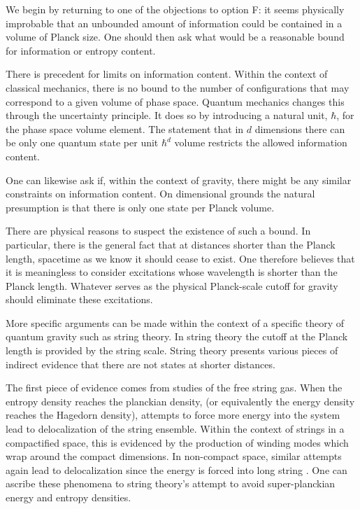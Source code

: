 \itemskip
We begin by returning to one of the objections to option F:
it seems physically improbable that
an unbounded amount of information could be
contained in a volume of Planck size.  One should then ask what would be
a reasonable bound for information or entropy content.

There is precedent for limits on information content.
Within the context of classical mechanics, there is no bound to the
number of configurations that may correspond to a given volume of phase
space.  Quantum mechanics changes this through the uncertainty
principle.  It does so
by introducing
a  natural unit,
$\hbar$,
for the phase space volume element.
The statement that in $d$ dimensions there  can be only
one quantum state per unit $\hbar^d$ volume  restricts the
allowed information content.

One can likewise ask if, within the context of gravity, there might
be any similar constraints on information content.
On dimensional grounds the natural presumption is that there is
only one state per Planck volume.

There are physical reasons to suspect the existence
of such a bound.  In particular, there
is the general fact that at distances shorter
than the Planck length, spacetime as we know it should cease to exist.
One therefore believes that it is meaningless to consider excitations
whose wavelength is shorter than the Planck length.  Whatever serves
as the physical Planck-scale cutoff for gravity should eliminate
these excitations.

More specific arguments can be made within the context of a specific
theory of quantum gravity such as string theory.  In string theory
the cutoff at the Planck length is provided by the string scale.
String theory presents
various pieces of indirect evidence  that
there are not states at shorter distances.

The first piece of evidence comes from studies of the free string
gas.  When the entropy density reaches the planckian density, (or
equivalently the energy density reaches the Hagedorn density),
attempts to force more energy into the system lead to delocalization
of the string ensemble.  Within the context of strings in a
compactified space, this is evidenced by the production of winding
modes  which wrap around the compact
dimensions.  In non-compact space, similar attempts again lead to
delocalization since the energy is forced into long
string .  One can
ascribe these phenomena to string theory's attempt to avoid
super-planckian energy
and entropy densities.

